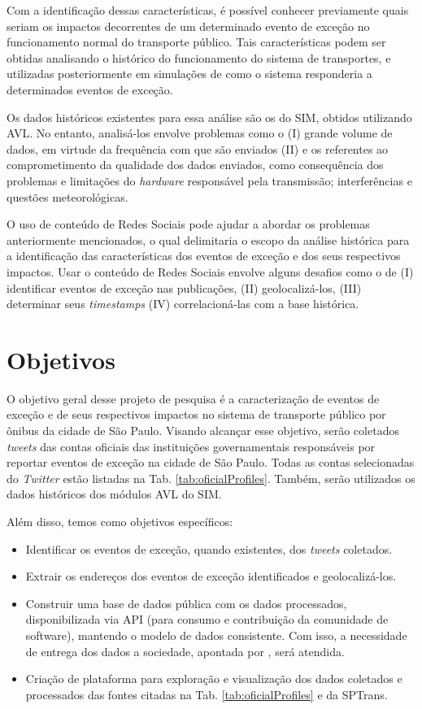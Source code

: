 \documentclass[
	12pt,				%
	oneside,			%
	a4paper,			%
	english,			%
	brazil				%
	]{abntex2ppgsi}
\begin{document}
Com a identificação dessas características, é possível conhecer previamente quais seriam os impactos decorrentes de um determinado evento de exceção no funcionamento normal do transporte público. Tais características podem ser obtidas analisando o histórico do funcionamento do sistema de transportes, e utilizadas posteriormente em simulações de como o sistema responderia a determinados eventos de exceção.

Os dados históricos existentes para essa análise são os do SIM, obtidos utilizando AVL. No entanto, analisá-los envolve problemas como o (I) grande volume de dados, em virtude da frequência com que são enviados (II) e os referentes ao comprometimento da qualidade dos dados enviados, como consequência dos problemas e limitações do \textit{hardware} responsável pela transmissão; interferências e questões meteorológicas. 

O uso de conteúdo de Redes Sociais pode ajudar a abordar os problemas anteriormente mencionados, o qual delimitaria o escopo da análise histórica para a identificação das características dos eventos de exceção e dos seus respectivos impactos. Usar o conteúdo de Redes Sociais envolve alguns desafios como o de (I) identificar eventos de exceção nas publicações, (II) geolocalizá-los, (III) determinar seus \textit{timestamps} (IV) correlacioná-las com a base histórica.  

\section{Objetivos}
\label{objetivos}
O objetivo geral desse projeto de pesquisa é a caracterização de eventos de exceção e de seus respectivos impactos no sistema de transporte público por ônibus da cidade de São Paulo. Visando alcançar esse objetivo, serão coletados \textit{tweets} das contas oficiais das instituições governamentais responsáveis por reportar eventos de exceção na
cidade de São Paulo. Todas as contas selecionadas do \textit{Twitter} estão listadas na Tab. \ref{tab:oficialProfiles}. Também, serão utilizados os dados históricos dos módulos AVL do SIM. 

Além disso, temos como objetivos específicos:

\begin{itemize}
    \item Identificar os eventos de exceção, quando existentes, dos \textit{tweets} coletados.
     \item Extrair os endereços dos eventos de exceção identificados e geolocalizá-los.
		\item Construir uma base de dados pública com os dados processados, disponibilizada via API (para consumo e contribuição da comunidade de software), mantendo o modelo de dados consistente. Com isso, a necessidade de entrega dos dados a sociedade, apontada por \cite{kuflik2017automating}, será atendida.
\item Criação de plataforma para exploração e visualização dos dados coletados e processados das fontes citadas na Tab. \ref{tab:oficialProfiles} e da SPTrans.
\end{itemize}
\end{document}
